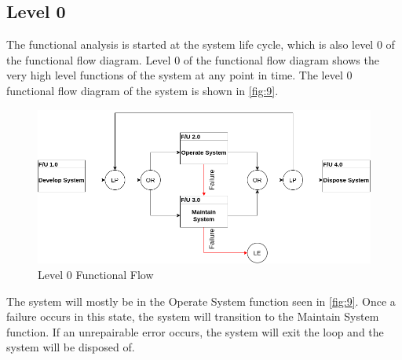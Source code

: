 \subsection{Level 0}
The functional analysis is started at the system life cycle, which is also level 0 of the functional flow diagram. Level 0 of the functional flow diagram shows the very high level functions of the system at any point in time. The level 0 functional flow diagram of the system is shown in \autoref{fig:9}.
\begin{figure}[H]
	\centering
	\includegraphics[scale=0.5]{img/L0FF}
	\caption{Level 0 Functional Flow}
	\label{fig:9}
\end{figure}
\noindent
The system will mostly be in the Operate System function seen in \autoref{fig:9}. Once a failure occurs in this state, the system will transition to the Maintain System function. If an unrepairable error occurs, the system will exit the loop and the system will be disposed of.  

